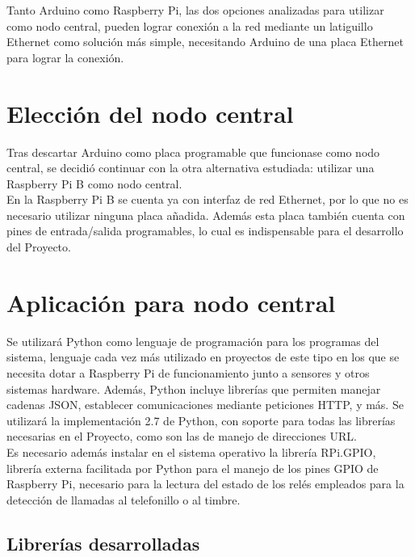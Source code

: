     Tanto Arduino como Raspberry Pi, las dos opciones analizadas para utilizar como nodo central, pueden lograr conexión a la red mediante un latiguillo Ethernet como solución más simple, necesitando Arduino de una placa Ethernet para lograr la conexión.

\section{Elección del nodo central}

    Tras descartar Arduino como placa programable que funcionase como nodo central, se decidió continuar con la otra alternativa estudiada: utilizar una Raspberry Pi B como nodo central. \\

    En la Raspberry Pi B se cuenta ya con interfaz de red Ethernet, por lo que no es necesario utilizar ninguna placa añadida. Además esta placa también cuenta con pines de entrada/salida programables, lo cual es indispensable para el desarrollo del Proyecto. \\

\section{Aplicación para nodo central}

    Se utilizará Python como lenguaje de programación para los programas del sistema, lenguaje cada vez más utilizado en proyectos de este tipo en los que se necesita dotar a Raspberry Pi de funcionamiento junto a sensores y otros sistemas hardware. Además, Python incluye librerías que permiten manejar cadenas JSON, establecer comunicaciones mediante peticiones HTTP, y más. Se utilizará la implementación 2.7 de Python, con soporte para todas las librerías necesarias en el Proyecto, como son las de manejo de direcciones URL.\\

    Es necesario además instalar en el sistema operativo la librería RPi.GPIO, librería externa facilitada por Python para el manejo de los pines GPIO de Raspberry Pi, necesario para la lectura del estado de los relés empleados para la detección de llamadas al telefonillo o al timbre. \\


    \subsection{Librerías desarrolladas}

